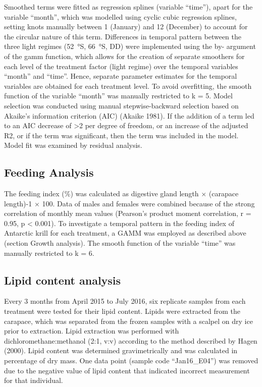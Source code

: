 Smoothed terms were fitted as regression splines (variable “time”), apart for
the variable “month”, which was modelled using cyclic cubic regression splines,
setting knots manually between 1 (January) and 12 (December) to account for the
circular nature of this term. Differences in temporal pattern between the three
light regimes (\SI{52}{\degree}S, \SI{66}{\degree}S, DD) were implemented using the by- argument of the
gamm function, which allows for the creation of separate smoothers for each
level of the treatment factor (light regime) over the temporal variables
“month” and “time”. Hence, separate parameter estimates for the temporal
variables are obtained for each treatment level. To avoid overfitting, the
smooth function of the variable “month” was manually restricted to k = 5. Model
selection was conducted using manual stepwise-backward selection based on
Akaike’s information criterion (AIC) (Akaike 1981). If the addition of a term
led to an AIC decrease of >2 per degree of freedom, or an increase of the
adjusted R2, or if the term was significant, then the term was included in the
model. Model fit was examined by residual analysis.

\subsection{Feeding Analysis}

The feeding index (\%) was calculated as digestive gland length $\times$
(carapace length)-1 $\times$ 100. Data of males and females were combined
because of the strong correlation of monthly mean values (Pearson’s product
moment correlation, r = 0.95, p < 0.001). To investigate a temporal pattern in
the feeding index of Antarctic krill for each treatment, a GAMM was employed as
described above (section Growth analysis). The smooth function of the variable
“time” was manually restricted to k = 6.

\subsection{Lipid content analysis}

Every 3 months from April 2015 to July 2016, six replicate samples from each
treatment were tested for their lipid content. Lipids were extracted from the
carapace, which was separated from the frozen samples with a scalpel on dry ice
prior to extraction. Lipid extraction was performed with
dichloromethane:methanol (2:1, v:v) according to the method described by Hagen
(2000). Lipid content was determined gravimetrically and was calculated in
percentage of dry mass. One data point (sample code “Jan16\_E04”) was removed
due to the negative value of lipid content that indicated incorrect measurement
for that individual. 

